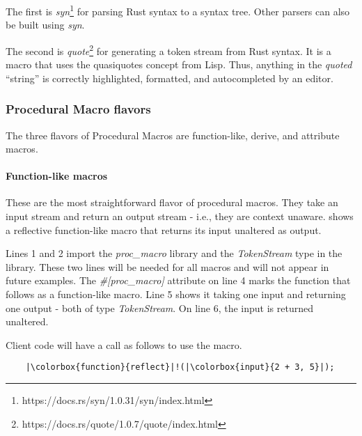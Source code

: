 The first is \textit{syn}\footnote{https://docs.rs/syn/1.0.31/syn/index.html} for parsing Rust syntax to a syntax tree.
Other parsers can also be built using \textit{syn}.

The second is \textit{quote}\footnote{https://docs.rs/quote/1.0.7/quote/index.html} for generating a token stream from Rust syntax.
It is a macro that uses the quasiquotes concept from Lisp.
Thus, anything in the \textit{quoted} ``string'' is correctly highlighted, formatted, and autocompleted by an editor.

\subsubsection{Procedural Macro flavors}
\label{sec:procedural-macro-flavors}

The three flavors of Procedural Macros are function-like, derive, and attribute macros.

\paragraph{Function-like macros}
These are the most straightforward flavor of procedural macros.
They take an input stream and return an output stream - i.e., they are context unaware.
 shows a reflective function-like macro that returns its input unaltered as output.


Lines 1 and 2 import the \textit{proc\_macro} library and the \textit{TokenStream} type in the library.
These two lines will be needed for all macros and will not appear in future examples.
The \textit{\#[proc\_macro]} attribute on line 4 marks the function that follows as a function-like macro.
Line 5 shows it taking one \colorbox{input}{input} and returning one \colorbox{output}{output} - both of type \textit{TokenStream}.
On line 6, the input is returned unaltered.

Client code will have a call as follows to use the macro.

\begin{verbatim}
	|\colorbox{function}{reflect}|!(|\colorbox{input}{2 + 3, 5}|);
\end{verbatim}

